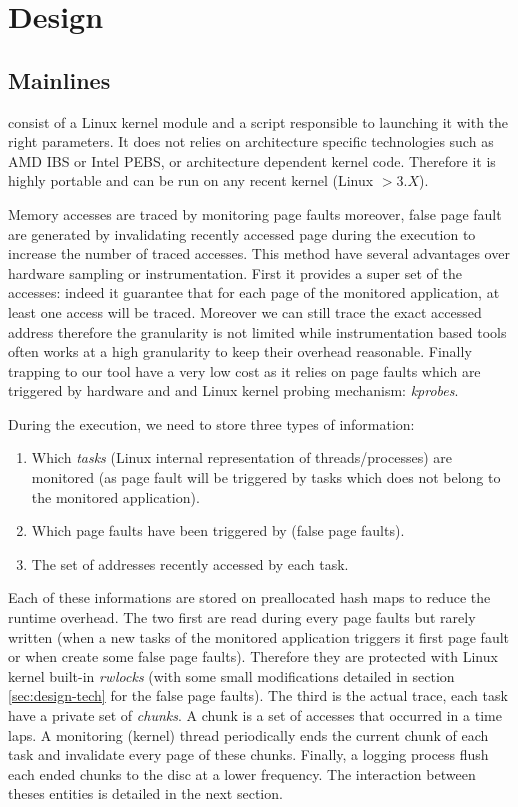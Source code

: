 \section{Design}
\label{sec:design}

\subsection{Mainlines}

\Moca consist of a Linux kernel module and a script responsible to launching it
with the right parameters. It does not relies on architecture specific
technologies such as AMD IBS or Intel PEBS, or architecture dependent kernel
code. Therefore it is highly portable and can be run on any recent kernel
(Linux $> 3.X$).

Memory accesses are traced by monitoring page faults moreover, false page
fault are generated by invalidating recently accessed page during the
execution to increase the number of traced accesses. This method have several
advantages over hardware sampling or instrumentation. First it provides a
super set of the accesses: indeed it guarantee that for each page of the
monitored application, at least one access will be traced. Moreover we can
still trace the exact accessed address therefore the granularity is not
limited while instrumentation based tools often works at a high granularity to
keep their overhead reasonable.  Finally trapping to our tool have a very low
cost as it relies on page faults which are triggered by hardware and and Linux
kernel probing mechanism: \emph{kprobes}.

During the execution, we need to store three types of information:
\begin{enumerate}
    \item Which \emph{tasks} (Linux internal representation of threads/processes) are
monitored (as page fault will be triggered by tasks which does not belong to
the monitored application).
    \item Which page faults have been triggered by \Moca (false page faults).
    \item The set of addresses recently accessed by each task.
\end{enumerate}
Each of these informations are stored on preallocated hash maps to reduce the
runtime overhead. The two first are read during every page faults but rarely
written (when a new tasks of the monitored application triggers it first page
fault or when \Moca create some false page faults). Therefore they are
protected with Linux kernel built-in \emph{rwlocks} (with some small
modifications detailed in section \ref{sec:design-tech} for the false page
faults). The third is the actual trace, each task have a private set of
\emph{chunks}. A chunk is a set of accesses that occurred in a time laps. A
monitoring (kernel) thread periodically ends the current chunk of each task
and invalidate every page of these chunks. Finally, a logging process flush
each ended chunks to the disc at a lower frequency. The interaction between
theses entities is detailed in the next section.

